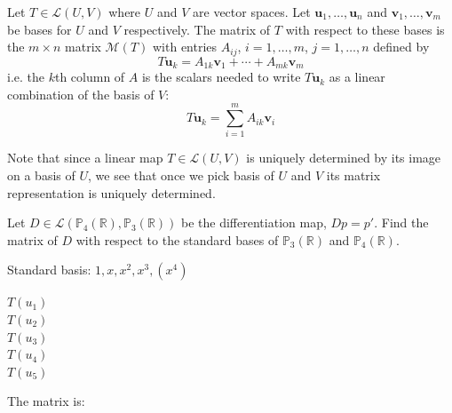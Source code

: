 \documentclass [aspectratio=169]{beamer}
\newcommand{\bu}{{\mathbf{u}}}
\newcommand{\bv}{{\mathbf{v}}}
\newcommand{\R}{{\mathbb{R}}}
\begin{document}
\begin{frame}
\begin{definition}\label{def:matrix_rep}
Let $T \in \mathcal{L}(U,V)$ where $U$ and $V$ are vector spaces. Let $\bu_1, \ldots, \bu_n$ and $\bv_1, \ldots, \bv_m$ be bases for $U$ and $V$ respectively. The matrix of $T$ with respect to these bases is the $m \times n$ matrix $\mathcal{M}(T)$ with entries $A_{ij}$, $i = 1, \ldots, m$, $j = 1, \ldots, n$ defined by
\begin{equation*}
    T\bu_k = A_{1k} \bv_1 + \cdots + A_{mk} \bv_m
\end{equation*}
i.e. the $k$th column of $A$ is the scalars needed to write $T \bu_k$ as a linear combination of the basis of $V$:
\begin{equation*}
    T \bu_k = \sum_{i=1}^m A_{ik} \bv_i 
\end{equation*}
\end{definition}

Note that since a linear map $T\in \mathcal{L}(U,V)$ is uniquely determined by its image on a basis of $U$, we see that once we pick basis of $U$ and $V$ its matrix representation is uniquely determined. 

\end{frame}




\begin{frame}
\begin{example}
Let $D \in \mathcal{L}(\mathbb{P}_4(\R),\mathbb{P}_3(\R))$ be the differentiation map, $Dp = p'$. Find the matrix of $D$ with respect to the standard bases of $\mathbb{P}_3(\R)$ and $\mathbb{P}_4(\R)$.

Standard basis: $1, x, x^2, x^3, (x^4)$ 
\vspace{1em}

$T(u_1) $ \\
$T(u_2)  $ \\ 
$T(u_3) $ \\ 
$T(u_4) $ \\
$T(u_5) $
\vspace{1em}

The matrix is:
\vspace{2cm}
\end{example}

\end{frame}
\end{document}
